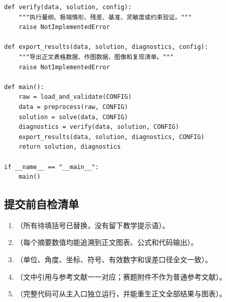 \documentclass[UTF8,zihao=-4]{ctexart}
\newcommand{\fillin}[1]{（#1）}
\begin{document}
\begin{Verbatim}[fontsize=\scriptsize,breaklines=true,breakanywhere=true,frame=single]
def verify(data, solution, config):
    """执行量纲、极端情形、残差、基准、灵敏度或约束验证。"""
    raise NotImplementedError

def export_results(data, solution, diagnostics, config):
    """导出正文表格数据、作图数据、图像和复现清单。"""
    raise NotImplementedError

def main():
    raw = load_and_validate(CONFIG)
    data = preprocess(raw, CONFIG)
    solution = solve(data, CONFIG)
    diagnostics = verify(data, solution, CONFIG)
    export_results(data, solution, diagnostics, CONFIG)
    return solution, diagnostics

if __name__ == "__main__":
    main()
\end{Verbatim}

\subsection{提交前自检清单}

\begin{enumerate}[leftmargin=2em,itemsep=0pt,topsep=2pt]
  \item \fillin{所有待填括号已替换，没有留下教学提示语}。
  \item \fillin{每个摘要数值均能追溯到正文图表、公式和代码输出}。
  \item \fillin{单位、角度、坐标、符号、有效数字和误差口径全文一致}。
  \item \fillin{文中引用与参考文献一一对应；赛题附件不作为普通参考文献}。
  \item \fillin{完整代码可从主入口独立运行，并能重生正文全部结果与图表}。
\end{enumerate}
\end{document}
